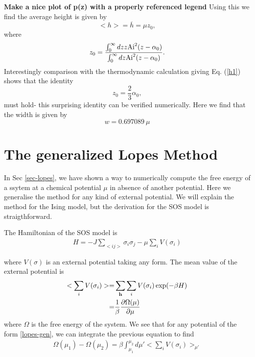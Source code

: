 {\bf Make a nice plot of p(z) with a properly referenced legend}
Using this we find the average height is given by
\begin{equation}
    < h> = \overline h= \mu z_0,
\end{equation}
where 
\begin{equation}
    z_0 = \frac{\int_0^\infty dz z {\rm Ai}^2(z-\alpha_0)}{\int_0^\infty dz {\rm Ai}^2(z-\alpha_0)}.
\end{equation}
Interestingly comparison with the thermodynamic calculation giving Eq. (\ref{h1}) shows that the identity
\begin{equation}
    z_0 = \frac{2}{3}\alpha_0,
\end{equation}
must hold- this surprising identity can be verified numerically. Here we find that the width is given by
\begin{equation}
    w= 0.697089 \ \mu
\end{equation}

    \section{The generalized Lopes Method}

In Sec \ref{sec-lopes}, we have shown a way to numerically compute the free energy of a ssytem at a chemical potential $\mu$ in absence of another potential. Here we generalise the method for any kind of external potential. We will explain the method for the Ising model, but the derivation for the SOS model is straigthforward.

The Hamiltonian of the SOS model is
\begin{align}
    H = - J \sum_{<ij>} \sigma_i \sigma_j - \mu \sum_i V(\sigma_i)
\end{align}

where $V(\sigma)$ is an external potential taking any form. The mean value of the external potential is
\begin{align}
    <  \sum_i V(\sigma_i) > =&  \sum_{\bf h} \sum_i V(\sigma_i) \exp(-\beta H) \nonumber \\
    =& \frac{1}{ \beta} \frac{\partial \Omega(\mu)}{\partial \mu}
\end{align}
where $\Omega$ is the free energy of the system. We see that for any potential of the form \eqref{lopes-gen}, we can integrate the previous equation to find
\begin{align}
   \Omega(\mu_1) - \Omega(\mu_2) = \beta \int_{\mu_1}^{\mu_2} d\mu'  < \sum_i V(\sigma_i) >_{\mu'} 
   \label{lopes-gen}
\end{align}

